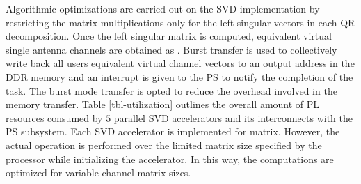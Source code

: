 \documentclass[conference,letterpaper,10pt]{./../../IEEE/IEEEtran}
\begin{document}
Algorithmic optimizations are carried out on the SVD implementation by restricting the matrix multiplications only for the left singular vectors in each QR decomposition. Once the left singular matrix is computed, equivalent virtual single antenna channels are obtained as . Burst transfer is used to collectively write back all users equivalent virtual channel vectors to an output address in the DDR memory and an interrupt is given to the PS to notify the completion of the task. The burst mode transfer is opted to reduce the overhead involved in the memory transfer. Table \ref{tbl-utilization} outlines the overall amount of PL resources consumed by $5$ parallel SVD accelerators and its interconnects with the PS subsystem. Each SVD accelerator is implemented for  matrix. However, the actual operation is performed over the limited matrix size specified by the processor while initializing the accelerator. In this way, the computations are optimized for variable channel matrix sizes.
\end{document}
